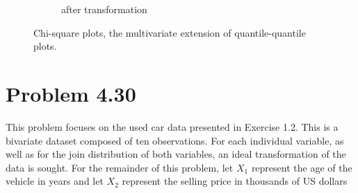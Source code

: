 \begin{enumerate}
\begin{figure}[H]
\begin{subfigure}{.5\textwidth}
  \caption{after transformation}
  \label{fig:sfig2}
\end{subfigure}
\caption{Chi-square plots, the multivariate extension of quantile-quantile plots.}
\end{figure}

\end{enumerate}

\newpage
\section*{Problem 4.30}
This problem focuses on the used car data presented in Exercise 1.2. This is a bivariate dataset composed of ten observations. For each individual variable, as well as for the join distribution of both variables, an ideal transformation of the data is sought. For the remainder of this problem, let $X_1$ represent the age of the vehicle in years and let $X_2$ represent the selling price in thousands of US dollars


